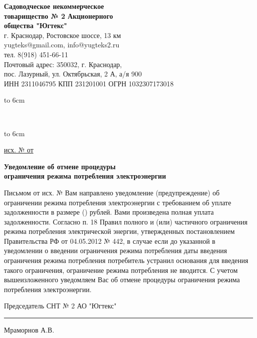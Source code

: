 \noindent\parbox[l][71mm]{80mm}
{
	 \begin{center}
 { \textbf{Садоводческое некоммерческое\\ товарищество
 	№  2 Акционерного\\ общества "Югтекс"\\
 }}
 \footnotesize{г. Краснодар, Ростовское шоссе, 13 км\\
 	yugteks@gmail.com, info@yugteks2.ru\\
 	тел. 8(918) 451-66-11\\
 	Почтовый адрес: 350032, г. Краснодар,\\ пос. Лазурный, ул. Октябрьская, 2 А, а/я   900
  }\\
 {ИНН 2311046795 КПП 231201001 ОГРН 1032307173018}
		\end{center}
\hbox to 6cm{ }}\hfill
\parbox[l][71mm]{65mm}
{ \begin{center}
{
	\textbf{}\\
	\vspace{3mm}
 {\footnotesize {} }

	}
\end{center}
\hbox to 6cm{ }}
\linebreak
\vspace{-17mm}

\underline{исх. №  от } 

\vspace{5mm}
\begin{center}
	\Large\textbf{Уведомление об отмене процедуры\\
		ограничения режима потребления электроэнергии}
\end{center}
\par
\vspace{5mm}


Письмом от          исх. №     Вам    направлено уведомление (предупреждение) об  ограничении режима потребления электроэнергии с требованием об уплате задолженности в размере     ()       рублей.
  Вами произведена полная уплата задолженности.
Согласно п. 18 Правил полного и (или) частичного ограничения режима потребления электрической энергии, утвержденных постановлением Правительства РФ от 04.05.2012 № 442, в случае если до указанной в уведомлении о введении ограничения режима потребления даты введения ограничения режима потребления потребитель устранил основания для введения такого ограничения, ограничение режима потребления не вводится.
С учетом вышеизложенного уведомляем Вас об отмене процедуры ограничения режима потребления электроэнергии. 

\vspace{5mm}



\vspace{15mm}
\noindent Председатель СНТ № 2 АО "Югтекс" \hfill    \rule{3cm}{0.1 mm}    Мраморнов А.В.



